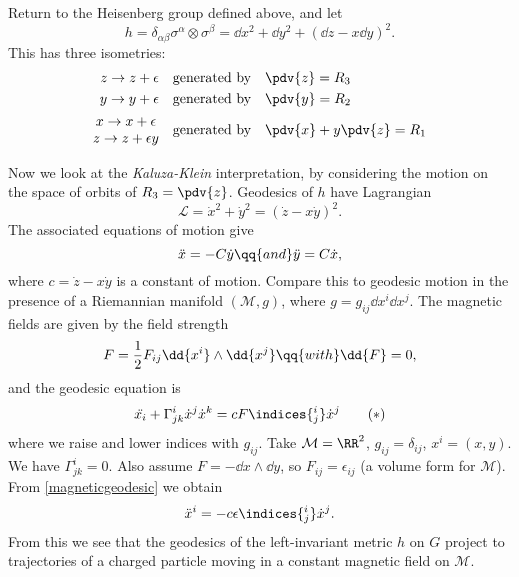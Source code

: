 \documentclass{jknotes}
\begin{document}
\begin{eg}
    Return to the Heisenberg group defined above, and let
    \begin{equation}
        h = \delta_{\alpha\beta}\sigma^\alpha\otimes\sigma^\beta = \dd{x}^2 + \dd{y}^2 + (\dd{z}-x\dd{y})^2.
    \end{equation}
    This has three isometries:
    \begin{align}
        z \to z+\epsilon \quad&\text{generated by}\quad \pdv{z} = R_3 \\
        y \to y+\epsilon \quad&\text{generated by}\quad \pdv{y} = R_2 \\
        \begin{matrix}
            x\to x+\epsilon \\ z\to z+\epsilon y
        \end{matrix}\quad&\text{generated by}\quad \pdv{x} + y\pdv{z} = R_1
    \end{align}
\end{eg}

Now we look at the \emph{Kaluza-Klein} interpretation, by considering the motion on the space of orbits of \(R_3=\pdv{z}\). Geodesics of \(h\) have Lagrangian
\begin{equation}
    \mathcal{L} = \dot{x}^2 + \dot{y}^2 = (\dot{z}-x\dot{y})^2.
\end{equation}
The associated equations of motion give
\begin{equation}
    \ddot{x} = -C\dot{y} \qq{and} \ddot{y} = C\dot{x},
\end{equation}
where \(c = \dot{z}-x\dot{y}\) is a constant of motion. Compare this to geodesic motion in the presence of a Riemannian manifold \((\mathcal{M},g)\), where \(g = g_{ij}\dd{x^i}\dd{x^j}\). The magnetic fields are given by the field strength
\begin{equation}
    F = \frac{1}{2}F_{ij}\dd{x^i}\wedge\dd{x^j} \qq{with} \dd{F} = 0,
\end{equation}
and the geodesic equation is
\begin{equation}
    \ddot{x_i} + \Gamma^i_{jk}\dot{x}^j\dot{x}^k = c F\indices{^i_j}\dot{x}^j
    \tag{\(*\)}
    \label{magneticgeodesic}
\end{equation}
where we raise and lower indices with \(g_{ij}\). Take \(\mathcal{M}=\RR^2\), \(g_{ij}=\delta_{ij}\), \(x^i=(x,y)\). We have \(\Gamma^i_{jk} = 0\). Also assume \(F=-\dd{x}\wedge\dd{y}\), so \(F_{ij} = \epsilon_{ij}\) (a volume form for \(\mathcal{M}\)). From \eqref{magneticgeodesic} we obtain
\begin{equation}
    \ddot{x}^i = -c \epsilon\indices{^i_j} \dot{x}^j.
\end{equation}
From this we see that the geodesics of the left-invariant metric \(h\) on \(G\) project to trajectories of a charged particle moving in a constant magnetic field on \(\mathcal{M}\).
\end{document}
